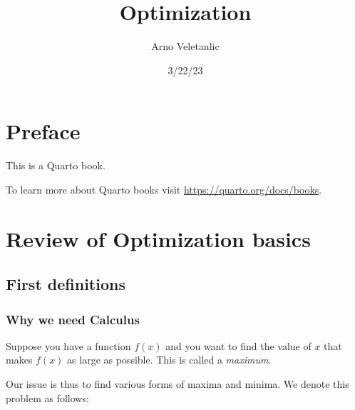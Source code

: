 \documentclass[
  letterpaper,
  DIV=11,
  numbers=noendperiod]{scrreprt}
\title{Optimization}
\author{Arno Veletanlic}
\date{3/22/23}
\renewcommand*\contentsname{Table of contents}
\newcommand\contentsname{Table of contents}
\begin{document}
\maketitle
\ifdefined\Shaded\renewenvironment{Shaded}{\begin{tcolorbox}[enhanced, borderline west={3pt}{0pt}{shadecolor}, breakable, frame hidden, sharp corners, interior hidden, boxrule=0pt]}{\end{tcolorbox}}\fi

\renewcommand*\contentsname{Table of contents}
{
\hypersetup{linkcolor=}
\setcounter{tocdepth}{2}
\tableofcontents
}

\hypertarget{preface}{%
\chapter*{Preface}\label{preface}}


This is a Quarto book.

To learn more about Quarto books visit
\url{https://quarto.org/docs/books}.


\hypertarget{review-of-optimization-basics}{%
\chapter{Review of Optimization
basics}\label{review-of-optimization-basics}}

\hypertarget{first-definitions}{%
\section{First definitions}\label{first-definitions}}

\hypertarget{why-we-need-calculus}{%
\subsection{Why we need Calculus}\label{why-we-need-calculus}}

Suppose you have a function \(f(x)\) and you want to find the value of
\(x\) that makes \(f(x)\) as large as possible. This is called a
\emph{maximum}.

Our issue is thus to find various forms of maxima and minima. We denote
this problem as follows:
\end{document}
